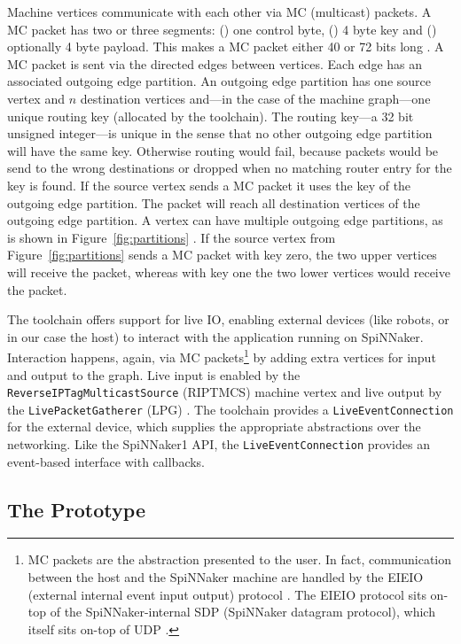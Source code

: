 \documentclass[]{article}
\begin{document}
Machine vertices communicate with each other via MC (multicast)
packets.
A MC packet has two or three segments:
() one control byte, () 4 byte key
and () optionally 4 byte payload.
This makes a MC packet either 40 or 72 bits long
\citep{furber_et_al_2020}.
A MC packet is sent via the directed edges between vertices.
Each edge has an associated outgoing edge partition.
An outgoing edge partition has one source vertex and $n$ destination
vertices and---in the case of the machine graph---one unique
routing key (allocated by the toolchain).
The routing key---a 32 bit unsigned integer---is unique in the sense
that no other outgoing edge partition will have the same key.
Otherwise routing would fail, because packets would be send
to the wrong destinations or dropped when no matching router entry for
the key is found.
If the source vertex sends a MC packet it uses the key of the
outgoing edge partition.
The packet will reach all destination vertices of the outgoing edge
partition.
A vertex can have multiple outgoing edge partitions, as is shown in
Figure~\ref{fig:partitions} \citep{furber_et_al_2020}.
If the source vertex from Figure~\ref{fig:partitions} sends a MC
packet with key zero, the two upper vertices will receive the
packet, whereas with key one the two lower vertices would receive
the packet.

The toolchain offers support for live IO, enabling external devices
(like robots, or in our case the host) to interact with the
application running on SpiNNaker.
Interaction happens, again, via MC packets\footnote{%
  MC packets are the abstraction presented to the user. In fact,
  communication between the host and the SpiNNaker machine are handled
  by the EIEIO (external internal event input output) protocol
  \citep{rast_et_al_2015}.
  The EIEIO protocol sits on-top of the SpiNNaker-internal SDP
  (SpiNNaker datagram protocol), which itself sits on-top of UDP
  \citep{furber_et_al_2014}.
}
by adding extra vertices for input and output to the graph.
Live input is enabled by the \texttt{ReverseIPTagMulticastSource}
(RIPTMCS) machine vertex and live output by the
\texttt{LivePacketGatherer} (LPG) \citep{furber_et_al_2020}.
The toolchain provides a \texttt{LiveEventCon\-nection} for the
external device, which supplies the appropriate abstractions over the
networking.
Like the SpiNNaker1 API, the \texttt{Live\-Event\-Con\-nection}
provides an event-based interface with callbacks.



\subsection{The Prototype} %
\label{subsec:SpiDNN_arch}
\end{document}
